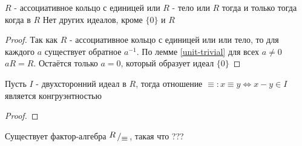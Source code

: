 \documentclass[../main/document.tex]{subfiles}
\begin{document}
\begin{thm}\label{only-trivial-ideal}
$R$ - ассоциативное кольцо с единицей или $R$ - тело или $R$ тогда и только тогда когда в $R$ Нет других идеалов, кроме $\{0\}$ и $R$
\begin{proof}
Так как $R$ - ассоциативное кольцо с единицей или или тело, то для каждого $a$ существует обратное $a^{-1}$. По лемме \ref{unit-trivial} для всех $a\neq 0$ $aR=R$. Остаётся только $a=0$, который образует идеал $\{0\}$
\end{proof}
\end{thm}
\begin{dfn}

\end{dfn}
\begin{thm}
Пусть $I$ - двухсторонний идеал в $R$, тогда отношение $\equiv: x\equiv y \Leftrightarrow x-y\in I$ является конгруэнтностью
\begin{proof}

\end{proof}
\end{thm}
\begin{cnsq}
Существует фактор-алгебра $\bigslant{R}{\equiv}$, такая что ???
\end{cnsq}
\end{document}
